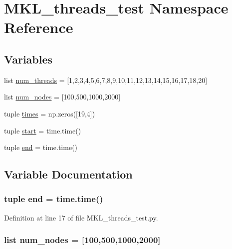 \hypertarget{namespace_m_k_l__threads__test}{\section{M\-K\-L\-\_\-threads\-\_\-test Namespace Reference}
\label{namespace_m_k_l__threads__test}
}
\subsection*{Variables}
\begin{DoxyCompactItemize}
\item 
list \hyperlink{namespace_m_k_l__threads__test_ae6e79b48a519c1db19903d69a0bbdb23}{num\-\_\-threads} = \mbox{[}1,2,3,4,5,6,7,8,9,10,11,12,13,14,15,16,17,18,20\mbox{]}
\item 
list \hyperlink{namespace_m_k_l__threads__test_aa960f02b9f7f22de9e3fbe916ffe62ac}{num\-\_\-nodes} = \mbox{[}100,500,1000,2000\mbox{]}
\item 
tuple \hyperlink{namespace_m_k_l__threads__test_a7a4cdc1f55476e6705c9c39b53d8ecb9}{times} = np.\-zeros(\mbox{[}19,4\mbox{]})
\item 
tuple \hyperlink{namespace_m_k_l__threads__test_ac19c5d7b91bdfde51f8a7f0614c6e424}{start} = time.\-time()
\item 
tuple \hyperlink{namespace_m_k_l__threads__test_a57e3a39358610bc8ca2a9456b15d8085}{end} = time.\-time()
\end{DoxyCompactItemize}


\subsection{Variable Documentation}
\hypertarget{namespace_m_k_l__threads__test_a57e3a39358610bc8ca2a9456b15d8085}{
\subsubsection[{end}]{\setlength{\rightskip}{0pt plus 5cm}tuple end = time.\-time()}}\label{namespace_m_k_l__threads__test_a57e3a39358610bc8ca2a9456b15d8085}


Definition at line 17 of file M\-K\-L\-\_\-threads\-\_\-test.\-py.

\hypertarget{namespace_m_k_l__threads__test_aa960f02b9f7f22de9e3fbe916ffe62ac}{
\subsubsection[{num\-\_\-nodes}]{\setlength{\rightskip}{0pt plus 5cm}list num\-\_\-nodes = \mbox{[}100,500,1000,2000\mbox{]}}}\label{namespace_m_k_l__threads__test_aa960f02b9f7f22de9e3fbe916ffe62ac}


